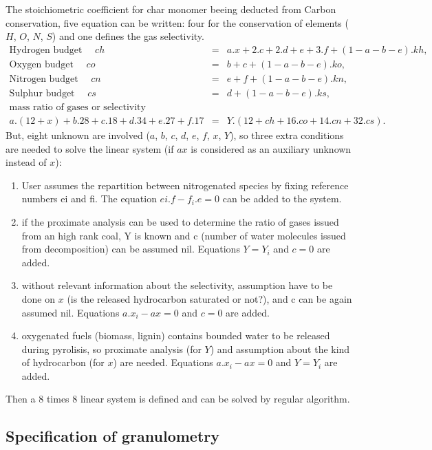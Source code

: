 The stoichiometric coefficient for char monomer beeing deducted from Carbon
conservation, five equation can be written: four for the conservation of
elements ($H$, $O$, $N$, $S$) and one defines the gas selectivity.
\begin{eqnarray*}
  \text{Hydrogen budget  } \quad ch &=& a.x + 2.c + 2.d + e + 3.f +(1-a-b-e).kh, \\
  \text{Oxygen budget    } \quad co &=& b + c + (1-a-b-e) . ko, \\
  \text{Nitrogen budget  } \quad cn &=& e + f + (1-a-b-e).kn, \\
  \text{Sulphur budget   } \quad cs &=& d + (1-a-b-e) .ks, \\
  \text{mass ratio of gases or selectivity} \\
  a.(12+x) + b.28 +c.18+d.34+e.27+f.17 &=& Y .(12+ch+16.co+14.cn+32.cs).
\end{eqnarray*}
But, eight unknown are involved ($a$, $b$, $c$, $d$, $e$, $f$, $x$, $Y$), so three extra
conditions are needed to solve the linear system (if $ax$ is considered as an
auxiliary unknown instead of $x$):
\begin{enumerate}

\item User assumes the repartition between nitrogenated species by fixing
  reference numbers ei and fi. The equation $ei.f-f_i.e=0$ can be added to the
  system.
\item if the proximate analysis can be used to determine the ratio of gases
  issued from an high rank coal, Y is known and c (number of water
  molecules issued from decomposition) can be assumed nil. Equations $Y=Y_i$ and
  $c=0$ are added.
\item without relevant information about the selectivity, assumption have to be
  done on $x$ (is the released hydrocarbon saturated or not?), and c can be again
  assumed nil. Equations $a.x_i-ax = 0$ and $c=0$ are added.
\item oxygenated fuels (biomass, lignin) contains bounded water to be released
  during pyrolisis, so proximate analysis (for $Y$) and assumption about the kind
  of hydrocarbon (for $x$) are needed. Equations $a.x_i-ax = 0$ and $Y=Y_i$ are
  added.

\end{enumerate}
Then a 8 times 8 linear system is defined and can be solved by regular algorithm.

\subsection{Specification of granulometry}

